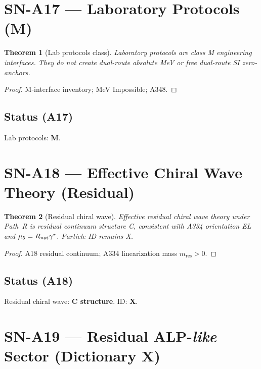 \documentclass[11pt,a4paper]{article}
\newtheorem{theorem}{Theorem}[section]
\theoremstyle{definition}
\begin{document}
\section{SN-A17 --- Laboratory Protocols (M)}
\label{sec:SNA17}

\begin{theorem}[Lab protocols class]
\label{thm:A17}
Laboratory protocols are class M engineering interfaces. They do not create dual-route absolute MeV
or free dual-route SI zero-anchors.
\end{theorem}

\begin{proof}
M-interface inventory; MeV Impossible; A348.
\end{proof}

\subsection*{Status (A17)} Lab protocols: \textbf{M}.

\section{SN-A18 --- Effective Chiral Wave Theory (Residual)}
\label{sec:SNA18}

\begin{theorem}[Residual chiral wave]
\label{thm:A18}
Effective residual chiral wave theory under Path~R is residual continuum structure C,
consistent with A334 orientation EL and $\mu_5=R_{\rm nat}\gamma^\star$.
Particle ID remains X.
\end{theorem}

\begin{proof}
A18 residual continuum; A334 linearization mass $m_{\mathrm{res}}>0$.
\end{proof}

\subsection*{Status (A18)} Residual chiral wave: \textbf{C structure}. ID: \textbf{X}.

\section{SN-A19 --- Residual ALP-\emph{like} Sector (Dictionary X)}
\label{sec:SNA19}
\end{document}
